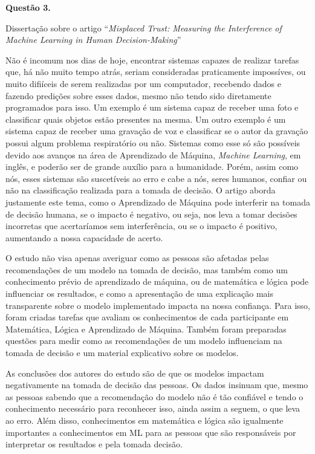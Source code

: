 \documentclass[11221709.tex]{subfiles}
\begin{document}
    \textbf{Questão 3.}

    \begin{center}
        Dissertação sobre o artigo ``\textit{Misplaced Trust:
        Measuring the Interference of Machine Learning in Human
        Decision-Making}''
    \end{center}

    Não é incomum nos dias de hoje, encontrar sistemas capazes de
    realizar tarefas que, há não muito tempo atrás, seriam
    consideradas praticamente impossíves, ou muito difiíceis de
    serem realizadas por um computador, recebendo dados e fazendo
    predições sobre esses dados, mesmo não tendo sido diretamente
    programados para isso. Um exemplo é um sistema capaz de receber
    uma foto e classificar quais objetos estão presentes na mesma.
    Um outro exemplo é um sistema capaz de receber uma gravação de
    voz e classificar se o autor da gravação possui algum problema
    respiratório ou não. Sistemas como esse só são possíveis devido
    aos avanços na área de Aprendizado de Máquina, \textit{Machine
    Learning}, em inglês, e poderão ser de grande auxílio para a
    humanidade. Porém, assim como nós, esses sistemas são
    suscetíveis ao erro e cabe a nós, seres humanos, confiar ou não
    na classificação realizada para a tomada de decisão. O artigo
    aborda justamente este tema, como o Aprendizado de Máquina pode
    interferir na tomada de decisão humana, se o impacto é negativo,
    ou seja, nos leva a tomar decisões incorretas que acertaríamos
    sem interferência, ou se o impacto é positivo, aumentando a
    nossa capacidade de acerto.

    O estudo não visa apenas averiguar como as pessoas são afetadas
    pelas recomendações de um modelo na tomada de decisão, mas
    também como um conhecimento prévio de aprendizado de máquina, ou
    de matemática e lógica pode influenciar os resultados, e como a
    apresentação de uma explicação mais transparente sobre o modelo
    implementado impacta na nossa confiança. Para isso, foram
    criadas tarefas que avaliam os conhecimentos de cada
    participante em Matemática, Lógica e Aprendizado de Máquina.
    Também foram preparadas questões para medir como as
    recomendações de um modelo influenciam na tomada de decisão e um
    material explicativo sobre os modelos.

    As conclusões dos autores do estudo são de que os modelos
    impactam negativamente na tomada de decisão das pessoas. Os
    dados insinuam que, mesmo as pessoas sabendo que a recomendação
    do modelo não é tão confiável e tendo o conhecimento necessário
    para reconhecer isso, ainda assim a seguem, o que leva ao erro.
    Além disso, conhecimentos em matemática e lógica são igualmente
    importantes a conhecimentos em ML para as pessoas que são
    responsáveis por interpretar os resultados e pela tomada
    decisão.
\end{document}
